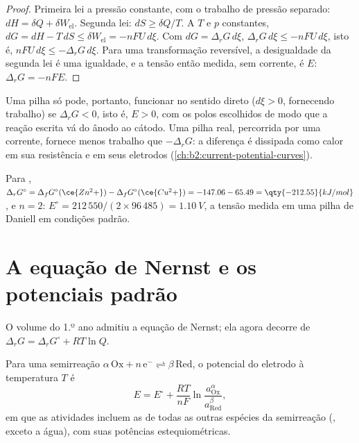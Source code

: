 \begin{proof}
Primeira lei a pressão constante, com o trabalho de pressão separado:
$dH = \delta Q + \delta W_{\text{el}}$. Segunda lei: $dS \geq \delta Q/T$. A
$T$ e $p$ constantes, $dG = dH - T\,dS \leq \delta W_{\text{el}} = -nFU\,d\xi$.
Com $dG = \Delta_r G\,d\xi$, $\Delta_r G\,d\xi \leq -nFU\,d\xi$, isto é,
$nFU\,d\xi \leq -\Delta_r G\,d\xi$. Para uma transformação reversível, a
desigualdade da segunda lei é uma igualdade, e a tensão então medida, sem
corrente, é $E$: $\Delta_r G = -nFE$.
\end{proof}

Uma pilha só pode, portanto, funcionar no sentido direto ($d\xi > 0$,
fornecendo trabalho) se $\Delta_r G <
0$, isto é, $E > 0$, com os polos escolhidos de modo que a reação escrita
vá do ânodo ao cátodo. Uma pilha real, percorrida por uma corrente, fornece
menos trabalho que $-\Delta_r G$: a diferença é dissipada como calor em sua
resistência e em seus eletrodos (\cref{ch:b2:current-potential-curves}).

\begin{example}\label{ex:b2:cell-thermodynamics:daniell}
Para , $\Delta_r G^\circ = \Delta_f G^\circ(\ce{Zn^2+}) -
\Delta_f G^\circ(\ce{Cu^2+}) = -147.06 - 65.49 = \qty{-212.55}{kJ/mol}$, e $n = 2$:
$E^\circ = 212\,550/(2 \times 96\,485) = \qty{1.10}{V}$, a tensão medida em uma
pilha de Daniell em condições padrão.
\end{example}

\section{A equação de Nernst e os potenciais padrão}

O volume do 1.º ano admitiu a equação de Nernst; ela agora decorre de
$\Delta_r G = \Delta_r G^\circ + RT\ln Q$.

\begin{theorem}\label{thm:b2:cell-thermodynamics:nernst-derived}
Para uma semirreação $\alpha\,\mathrm{Ox} + n\,\mathrm e^- \rightleftharpoons
\beta\,\mathrm{Red}$, o potencial do eletrodo à temperatura $T$ é
\[
  E = E^\circ + \frac{RT}{nF}\ln\frac{a_{\mathrm{Ox}}^{\alpha}}{a_{\mathrm{Red}}^{\beta}} ,
\]
em que as atividades incluem as de todas as outras espécies da
semirreação (, exceto a água), com suas potências estequiométricas.
\end{theorem}

